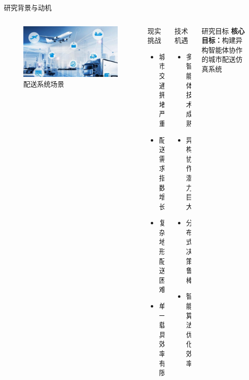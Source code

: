 \documentclass[
10pt,
aspectratio=169,
]{beamer}
\begin{document}
\begin{frame}{研究背景与动机}
    \begin{columns}
        \begin{column}{0.25\textwidth}
            \begin{figure}
                \centering
                \includegraphics[width=\linewidth]{background.png}
                \caption{配送系统场景}
            \end{figure}
        \end{column}
        \begin{column}{0.25\textwidth}
            \begin{block}{现实挑战}
                \begin{itemize}
                    \item 城市交通拥堵严重
                    \item 配送需求指数增长
                    \item 复杂地形配送困难
                    \item 单一载具效率有限
                \end{itemize}
            \end{block}
        \end{column}
        \begin{column}{0.25\textwidth}
            \begin{alertblock}{技术机遇}
                \begin{itemize}
                    \item 多智能体技术成熟
                    \item 异构协作潜力巨大
                    \item 分布式决策鲁棒
                    \item 智能算法优化效率
                \end{itemize}
            \end{alertblock}
        \end{column}
        \begin{column}{0.25\textwidth}
            \begin{exampleblock}{研究目标}
                \textbf{核心目标：}构建异构智能体协作的城市配送仿真系统
                

\end{exampleblock}
\end{column}
\end{columns}
\end{frame}
\end{document}
